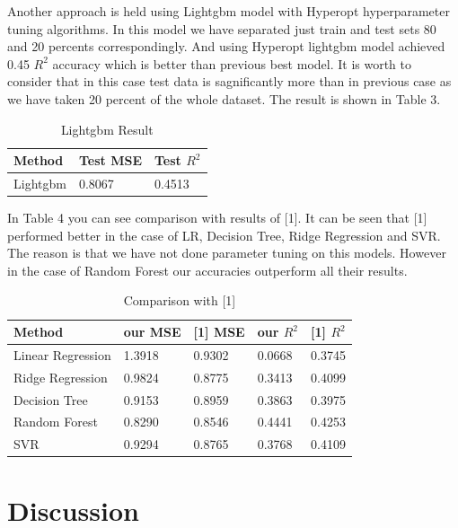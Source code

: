\documentclass{article}
\begin{document}
Another approach is held using Lightgbm model with Hyperopt hyperparameter tuning algorithms. In this model we have separated just train and test sets 80 and 20 percents correspondingly. And using Hyperopt lightgbm model achieved 0.45 $R^2$ accuracy which is better than previous best model. It is worth to consider that in this case test data is sagnificantly more than in previous case as we have taken 20 percent of the whole dataset. The result is shown in Table 3.

\begin{table}
  \caption{Lightgbm Result}
  \label{lgb_results-table}
  \centering
  \begin{tabular}{lll}
    \toprule
    Method & Test MSE &  Test $R^2$  \\
    \midrule
    Lightgbm & 0.8067  & 0.4513   \\
        \bottomrule
  \end{tabular}
\end{table}

In Table 4 you can see comparison with results of [1]. It can be seen that [1] performed better in the case of LR, Decision Tree, Ridge Regression and SVR. The reason is that we have not done parameter tuning on this models. However in the case of Random Forest our accuracies outperform all their results. 

\begin{table}
  \caption{Comparison with [1]}
  \label{cmp_results-table}
  \centering
  \begin{tabular}{lllll}
    \toprule
    Method & our MSE & [1] MSE &  our $R^2$  & [1] $R^2$  \\
    \midrule
    Linear Regression & 1.3918 & 0.9302  & 0.0668  & 0.3745   \\
    Ridge Regression & 0.9824 & 0.8775  & 0.3413 & 0.4099  \\
    Decision Tree & 0.9153  & 0.8959 & 0.3863  & 0.3975 \\
    Random Forest & 0.8290  & 0.8546 & 0.4441 & 0.4253 \\
    SVR & 0.9294 & 0.8765 & 0.3768  & 0.4109 \\
        \bottomrule
  \end{tabular}
\end{table}

\section{Discussion}
\end{document}
